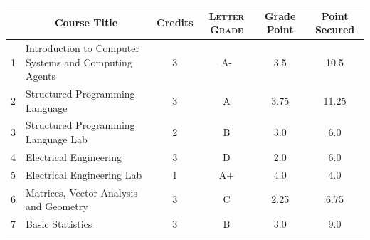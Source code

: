 \documentclass[11pt]{article}
\newcommand*{\numtwo}[1]{\pgfmathprintnumber[
                    fixed, precision=2, fixed zerofill=true]{#1}}
\begin{document}
                \begin{center}
                    \renewcommand{\arraystretch}{1.08}
                    
                \begin{tabular}{|c|l|c|>{\scshape}c|c|c|}
                \hline  \rule[-1ex]{0pt}{3.5ex} {\centering{\bf Course Code}} &  \multicolumn{1}{c|}{\textbf{Course Title}}  & {\bf Credits} & {\bf Letter Grade} & {\bf Grade Point} & {\bf Point Secured}  \\ 
                \hline   1 &  Introduction to Computer Systems and Computing Agents		 & 3 & A- & 3.5 & 10.5 \\ %
                \hline   2 &  Structured Programming Language		 & 3 & A & 3.75 & 11.25 \\ %
                \hline   3 &  Structured Programming Language Lab		 & 2 & B & 3.0 & 6.0 \\ %
                \hline   4 &  Electrical Engineering		 & 3 & D & 2.0 & 6.0 \\ %
                \hline   5 &  Electrical Engineering Lab		 & 1 & A+ & 4.0 & 4.0 \\ %
                \hline   6 &  Matrices, Vector Analysis and Geometry		 & 3 & C & 2.25 & 6.75 \\ %
                \hline   7 &  Basic Statistics		 & 3 & B & 3.0 & 9.0 \\ %

\hline                %
                \end{tabular}
                \end{center}
                \renewcommand{\arraystretch}{1.03}
\end{document}
